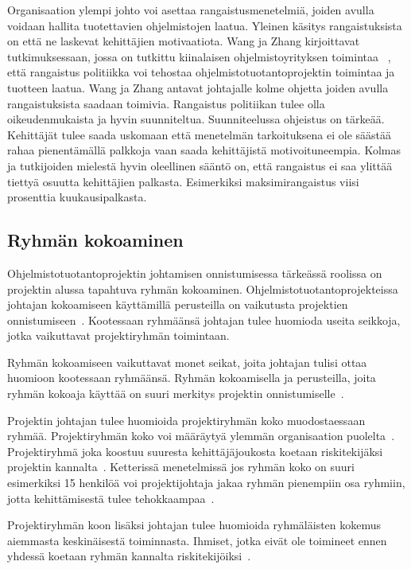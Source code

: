 \documentclass[finnish]{tktltiki2}
\theoremstyle{definition}
\theoremstyle{remark}
\begin{document}
Organisaation ylempi johto voi asettaa rangaistusmenetelmiä, joiden avulla voidaan hallita tuotettavien ohjelmistojen laatua. Yleinen käsitys rangaistuksista on että ne laskevat kehittäjien motivaatiota. Wang ja Zhang kirjoittavat tutkimuksessaan, jossa on tutkittu kiinalaisen ohjelmistoyrityksen toimintaa ~\cite{Wang:2010:PPP:1810295.1810302}, että rangaistus politiikka voi tehostaa ohjelmistotuotantoprojektin toimintaa ja tuotteen laatua. Wang ja Zhang antavat johtajalle kolme ohjetta joiden avulla rangaistuksista saadaan toimivia. Rangaistus politiikan tulee olla oikeudenmukaista ja hyvin suunniteltua. Suunniteelussa ohjeistus on tärkeää. Kehittäjät tulee saada uskomaan että menetelmän tarkoituksena ei ole säästää rahaa pienentämällä palkkoja vaan saada kehittäjistä motivoituneempia. Kolmas ja tutkijoiden mielestä hyvin oleellinen sääntö on, että rangaistus ei saa ylittää tiettyä osuutta kehittäjien palkasta. Esimerkiksi maksimirangaistus viisi prosenttia kuukausipalkasta.



\subsection{Ryhmän kokoaminen}


Ohjelmistotuotantoprojektin johtamisen onnistumisessa tärkeässä roolissa on projektin alussa tapahtuva ryhmän kokoaminen. Ohjelmistotuotantoprojekteissa johtajan kokoamiseen käyttämillä perusteilla on vaikutusta projektien onnistumiseen~\cite{daSilva2012}. Kootessaan ryhmäänsä johtajan tulee huomioda useita seikkoja, jotka vaikuttavat projektiryhmän toimintaan.  

Ryhmän kokoamiseen vaikuttavat monet seikat, joita johtajan tulisi ottaa huomioon kootessaan ryhmäänsä. Ryhmän kokoamisella ja perusteilla, joita ryhmän kokoaja käyttää on suuri merkitys projektin onnistumiselle~\cite{daSilva2012}.

Projektin johtajan tulee huomioida projektiryhmän koko muodostaessaan ryhmää. Projektiryhmän koko voi määräytyä ylemmän organisaation puolelta~\cite{McLeod:2011:FAS:1978802.1978803}. Projektiryhmä joka koostuu suuresta kehittäjäjoukosta koetaan riskitekijäksi projektin kannalta~\cite{McLeod:2011:FAS:1978802.1978803}. Ketterissä menetelmissä jos ryhmän koko on suuri esimerkiksi 15 henkilöä voi projektijohtaja jakaa ryhmän pienempiin osa ryhmiin, jotta kehittämisestä tulee tehokkaampaa~\cite{Augustine:2005:APM:1101779.1101781}.

Projektiryhmän koon lisäksi johtajan tulee huomioida ryhmäläisten kokemus aiemmasta keskinäisestä toiminnasta. Ihmiset, jotka eivät ole toimineet ennen yhdessä koetaan ryhmän kannalta riskitekijöiksi~\cite{McLeod:2011:FAS:1978802.1978803}. 
\end{document}
